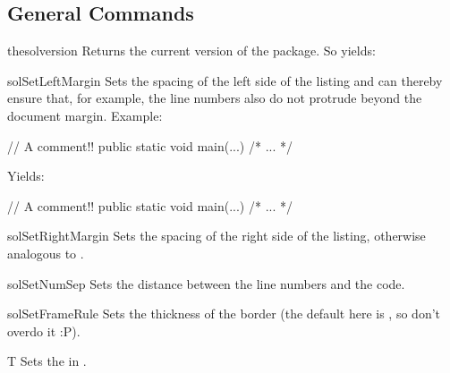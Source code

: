 \documentclass{sopra-base}
\begin{document}
\subsection{General Commands}

\begin{command}{thesolversion}{}
    Returns the current version of the package. So  yields: \thesolversion\\
\end{command}

\begin{command}{solSetLeftMargin}{}
    Sets the spacing of the left side of the listing and can thereby ensure that, for
    example, the line numbers also do not protrude beyond the document margin. Example:
\begin{latex}[morekeywords={[5]{\\solSetLeftMargin}}]
\solSetLeftMargin{15pt}
\begin{java}
// A comment!!
public static void main(...){ /* ... */ }
\end{java}
\end{latex}
Yields: {
\solSetLeftMargin{15pt}
\begin{java}
// A comment!!
public static void main(...){ /* ... */ }
\end{java}
}
\end{command}

\begin{command}{solSetRightMargin}{}
    Sets the spacing of the right side of the listing, otherwise analogous to .
\end{command}

\begin{command}{solSetNumSep}{}
    Sets the distance between the line numbers and the code.
\end{command}

\begin{command}{solSetFrameRule}{}
    Sets the thickness of the border (the default here is \bvoid{0.75pt}, so don't overdo it :P).
\end{command}

\begin{command}{T}{}
    Sets the  in .
\end{command}
\end{document}
